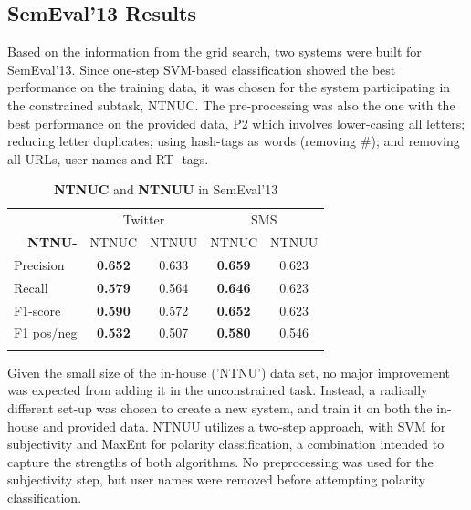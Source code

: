 \clearpage
\subsection{SemEval'13 Results}

Based on the information from the grid search, two systems were built for SemEval'13. Since one-step SVM-based classification showed the best performance on the training data, it was chosen for the system participating in the constrained subtask, NTNUC. The pre-processing was also the one with the best performance on the provided data, P2 which involves lower-casing all letters; reducing letter duplicates; using hash-tags as words (removing \#); and removing all URLs, user names and RT -tags.

\begin{table}

\centering
\begin{tabular}{l|cc|cc} 
\noalign{\smallskip}\hline\noalign{\smallskip}
	& \multicolumn{2}{c|}{Twitter}	& \multicolumn{2}{c}{SMS} \\
 \multicolumn{1}{r|}{\bf NTNU-}	&  {\footnotesize NTNUC}	& {\footnotesize NTNUU}	& {\footnotesize NTNUC}	& {\footnotesize NTNUU} \\
\noalign{\smallskip}\hline\noalign{\smallskip}
Precision    				& {\bf 0.652}	& 0.633 	& {\bf 0.659} 	& 0.623 \\
Recall       				& {\bf 0.579}  	& 0.564 	& {\bf 0.646} 	& 0.623  \\
F1-score  				& {\bf 0.590}  	& 0.572 	& {\bf 0.652} 	& 0.623  \\
F1 pos/neg 				& {\bf 0.532}  	& 0.507 	& {\bf 0.580} 	& 0.546  \\
\noalign{\smallskip}\hline\noalign{\smallskip}
\end{tabular}

\caption{{\bf NTNUC} and {\bf NTNUU} in SemEval'13}
\label{tab:semeval_results}
\end{table}

Given the small size of the in-house ('NTNU') data set, no major improvement was expected from adding it in the unconstrained task. Instead, a radically different set-up was chosen to create a new system, and train it on both the in-house and provided data. NTNUU utilizes a two-step approach, with SVM for subjectivity and MaxEnt for polarity classification, a combination intended to capture the strengths of both algorithms. No preprocessing was used for the subjectivity step, but user names were removed before attempting polarity classification.

